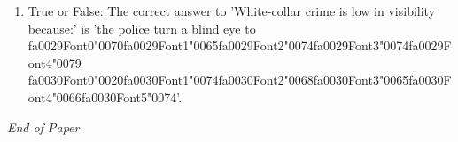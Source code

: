 \documentclass[12pt]{article}
\begin{document}
\begin{enumerate}[label=\arabic*.]
\item True or False: The correct answer to 'White-collar crime is low in visibility because:' is 'the police turn a blind eye to {\csname fa0029Font0\endcsname\char"0070}{\csname fa0029Font1\endcsname\char"0065}{\csname fa0029Font2\endcsname\char"0074}{\csname fa0029Font3\endcsname\char"0074}{\csname fa0029Font4\endcsname\char"0079} {\csname fa0030Font0\endcsname\char"0020}{\csname fa0030Font1\endcsname\char"0074}{\csname fa0030Font2\endcsname\char"0068}{\csname fa0030Font3\endcsname\char"0065}{\csname fa0030Font4\endcsname\char"0066}{\csname fa0030Font5\endcsname\char"0074}'.
\end{enumerate}

\vfill
\noindent\textit{End of Paper}
\end{document}
